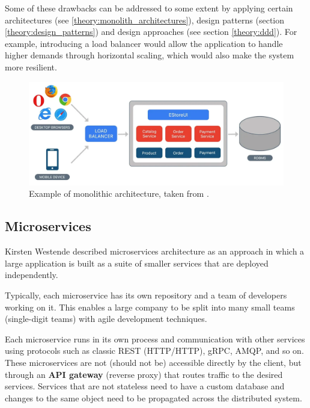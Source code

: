 Some of these drawbacks can be addressed to some extent by applying certain architectures (see \ref{theory:monolith_architectures}), design patterns (section \ref{theory:design_patterns}) and design approaches (see section \ref{theory:ddd}). For example, introducing a load balancer would allow the application to handle higher demands through horizontal scaling, which would also make the system more resilient.

\begin{figure} [H]
    \centering
    \includegraphics[width=\textwidth]{figures/monolith.png}
    \caption{Example of monolithic architecture, taken from \cite{siraj_ul_haq:intro_monolith_and_microservices}.}
    \label{fig:monolith_architecture}
\end{figure}

\subsection{Microservices}
\label{theory:microservices}
Kirsten Westende \cite{kirsten_westende:modular_monolith} described microservices architecture as an approach in which a large application is built as a suite of smaller services that are deployed independently.

Typically, each microservice has its own repository and a team of developers working on it. This enables a large company to be split into many small teams (single-digit teams) with agile development techniques.

Each microservice runs in its own process and communication with other services using protocols such as classic REST (HTTP/HTTP), gRPC, AMQP, and so on. These microservices are not (should not be) accessible directly by the client, but through an \textbf{API gateway} (reverse proxy) that routes traffic to the desired services. Services that are not stateless need to have a custom database and changes to the same object need to be propagated across the distributed system. 

